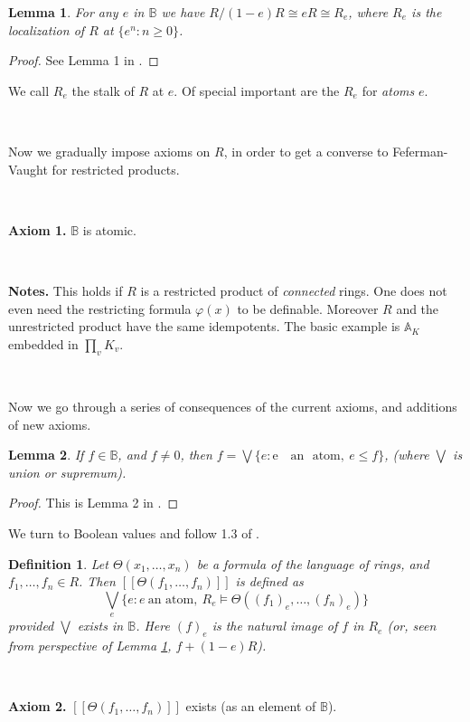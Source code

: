\documentclass[12pt]{amsart}
\def\A{\mathbb{A}}
\def\B{\mathbb{B}}
\def\A{\mathbb{A}}
\newtheorem{lemma}{Lemma}[section]
\newtheorem{Def}{Definition}[section]
\numberwithin{equation}{section}
\begin{document}
\begin{lemma}\label{lem1} For any $e$ in $\B$ we have $R/(1-e)R \cong eR \cong R_e$, where $R_e$ is the localization of $R$ at $\{e^n: n\geq 0\}$.
\end{lemma}
\begin{proof} See Lemma 1 in \cite{elem-prod}.\end{proof}

We call $R_e$ the stalk of $R$ at $e$. Of special important are the $R_e$ for {\it atoms} $e$.

\

Now we gradually impose axioms on $R$, in order to get a converse to Feferman-Vaught for restricted products.

\

{\bf Axiom 1.} $\B$ is atomic.

\

{\bf Notes.} This holds if $R$ is a restricted product of {\it connected} rings. One does not even need the restricting formula $\varphi(x)$ to be definable. Moreover $R$ and the unrestricted product have the same idempotents. The basic example is $\A_K$ embedded in $\prod_{v} K_v$.

\

Now we go through a series of consequences of the current axioms, and additions of new axioms.

\begin{lemma}\label{lem2} If $f\in \B$, and $f\neq 0$, then $f=\bigvee\{e: \text{e ~ an~ atom}, ~ e\leq f\}$, 
(where $\bigvee$ is union or supremum).
\end{lemma}
\begin{proof} This is Lemma 2 in \cite{elem-prod}.\end{proof}

We turn to Boolean values and follow 1.3 of \cite{elem-prod}.

\begin{Def} Let $\Theta(x_1,\dots,x_n)$ be a formula of the language of rings, and $f_1,\dots,f_n\in R$. Then 
$[[\Theta(f_1,\dots,f_n)]]$ is defined as 
$$\bigvee_{e} \{e: e~\text{an~atom},~R_e\models \Theta((f_1)_e,\dots,(f_n)_e)\}$$
provided $\bigvee$ exists in $\B$. Here $(f)_e$ is the natural image of $f$ in $R_e$ (or, seen from perspective of Lemma \ref{lem1}, $f+(1-e)R$).\end{Def}

\

{\bf Axiom 2.} $[[\Theta(f_1,\dots,f_n)]]$ exists (as an element of $\B$).
\end{document}
